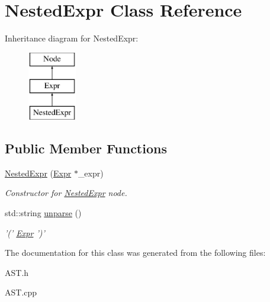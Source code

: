 \hypertarget{classNestedExpr}{\section{Nested\-Expr Class Reference}
\label{classNestedExpr}
}
Inheritance diagram for Nested\-Expr\-:\begin{figure}[H]
\begin{center}
\leavevmode
\includegraphics[height=3.000000cm]{classNestedExpr}
\end{center}
\end{figure}
\subsection*{Public Member Functions}
\begin{DoxyCompactItemize}
\item 
\hypertarget{classNestedExpr_a7da30ea4b79ff2c029eaf82e1811f817}{\hyperlink{classNestedExpr_a7da30ea4b79ff2c029eaf82e1811f817}{Nested\-Expr} (\hyperlink{classExpr}{Expr} $\ast$\-\_\-expr)}\label{classNestedExpr_a7da30ea4b79ff2c029eaf82e1811f817}

\begin{DoxyCompactList}\small\item\em Constructor for \hyperlink{classNestedExpr}{Nested\-Expr} node. \end{DoxyCompactList}\item 
\hypertarget{classNestedExpr_a4cf035c9980349fb9dbe6285b3ae4cc9}{std\-::string \hyperlink{classNestedExpr_a4cf035c9980349fb9dbe6285b3ae4cc9}{unparse} ()}\label{classNestedExpr_a4cf035c9980349fb9dbe6285b3ae4cc9}

\begin{DoxyCompactList}\small\item\em '(' \hyperlink{classExpr}{Expr} ')' \end{DoxyCompactList}\end{DoxyCompactItemize}


The documentation for this class was generated from the following files\-:\begin{DoxyCompactItemize}
\item 
A\-S\-T.\-h\item 
A\-S\-T.\-cpp\end{DoxyCompactItemize}
